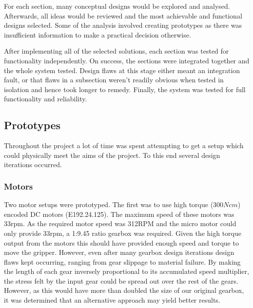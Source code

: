 \documentclass[conference]{IEEEtran}
\begin{document}
		For each section, many conceptual designs would be explored and analysed. Afterwards, all ideas would be reviewed and the most achievable and functional designs selected. Some of the analysis involved creating prototypes as there was insufficient information to make a practical decision otherwise.
		
		After implementing all of the selected solutions, each section was tested for functionality independently. On success, the sections were integrated together and the whole system tested. Design flaws at this stage either meant an integration fault, or that flaws in a subsection weren't readily obvious when tested in isolation and hence took longer to remedy. Finally, the system was tested for full functionality and reliability.
	

	\subsection{Prototypes}\label{prototypes}
	Throughout the project a lot of time was spent attempting to get a setup which could physically meet the aims of the project. To this end several design iterations occurred.
	
	\subsubsection{Motors}
	Two motor setups were prototyped. The first was to use high torque ($300Ncm$) encoded DC motors (E192.24.125). The maximum speed of these motors was 33rpm. As the required motor speed was 312RPM and the micro motor could only provide 33rpm, a 1:9.45 ratio gearbox was required.	Given the high torque output from the motors this should have provided enough speed and torque to move the gripper. However, even after many gearbox design iterations design flaws kept occurring, ranging from gear slippage to material failure. By making the length of each gear inversely proportional to its accumulated speed multiplier, the stress felt by the input gear could be spread out over the rest of the gears. However, as this would have more than doubled the size of our original gearbox, it was determined that an alternative approach may yield better results.
	
\end{document}
